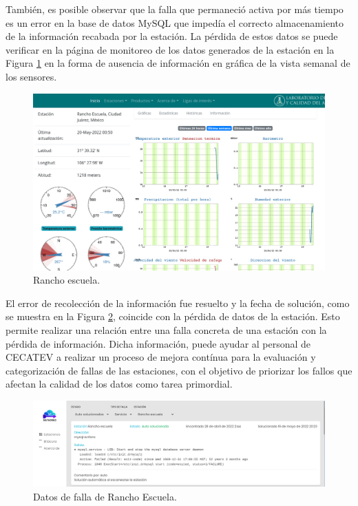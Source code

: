 También, es posible observar que la falla que permaneció activa por más tiempo es un error en la base de datos MySQL que impedía el correcto almacenamiento de la información recabada por la estación. La pérdida de estos datos se puede verificar en la página de monitoreo de los datos generados de la estación en la Figura \ref{fig:rancho-data-loss} en la forma de ausencia de información en gráfica de la vista semanal de los sensores.

\begin{figure}[!ht]
   \centering
   \includegraphics[width=1\linewidth]{images/screenshots/rancho-data-loss.png}
   \caption{Rancho escuela.}
   \label{fig:rancho-data-loss}
\end{figure}

El error de recolección de la información fue resuelto y la fecha de solución, como se muestra en la Figura \ref{fig:rancho-data-solved}, coincide con la pérdida de datos de la estación. Esto permite realizar una relación entre una falla concreta de una estación con la pérdida de información. Dicha información, puede ayudar al personal de CECATEV a realizar un proceso de mejora contínua para la evaluación y categorización de fallas de las estaciones, con el objetivo de priorizar los fallos que afectan la calidad de los datos como tarea primordial.

\begin{figure}[!ht]
   \centering
   \includegraphics[width=1\linewidth]{images/screenshots/rancho-mysql-solved.png}
   \caption{Datos de falla de Rancho Escuela.}
   \label{fig:rancho-data-solved}
\end{figure}

